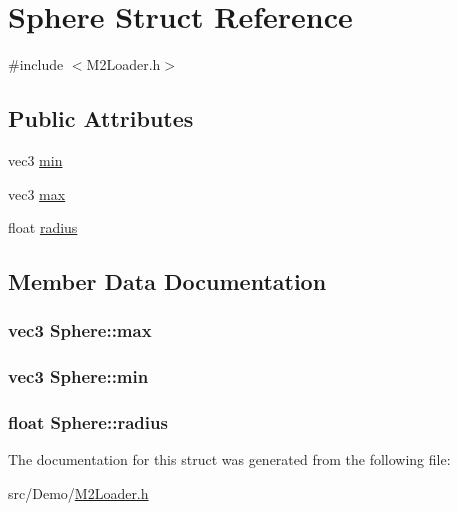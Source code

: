 \hypertarget{struct_sphere}{\section{Sphere Struct Reference}
\label{struct_sphere}
}


{\ttfamily \#include $<$M2\+Loader.\+h$>$}

\subsection*{Public Attributes}
\begin{DoxyCompactItemize}
\item 
vec3 \hyperlink{struct_sphere_adc106fc8b17889b893f11651fa5a29d9}{min}
\item 
vec3 \hyperlink{struct_sphere_aee6e629c46cebb1e1e91f6ef22c94ae2}{max}
\item 
float \hyperlink{struct_sphere_ae6f42f0da6679a2f0b4a22681ccccf38}{radius}
\end{DoxyCompactItemize}


\subsection{Member Data Documentation}
\hypertarget{struct_sphere_aee6e629c46cebb1e1e91f6ef22c94ae2}{
\subsubsection[{max}]{\setlength{\rightskip}{0pt plus 5cm}vec3 Sphere\+::max}}\label{struct_sphere_aee6e629c46cebb1e1e91f6ef22c94ae2}
\hypertarget{struct_sphere_adc106fc8b17889b893f11651fa5a29d9}{
\subsubsection[{min}]{\setlength{\rightskip}{0pt plus 5cm}vec3 Sphere\+::min}}\label{struct_sphere_adc106fc8b17889b893f11651fa5a29d9}
\hypertarget{struct_sphere_ae6f42f0da6679a2f0b4a22681ccccf38}{
\subsubsection[{radius}]{\setlength{\rightskip}{0pt plus 5cm}float Sphere\+::radius}}\label{struct_sphere_ae6f42f0da6679a2f0b4a22681ccccf38}


The documentation for this struct was generated from the following file\+:\begin{DoxyCompactItemize}
\item 
src/\+Demo/\hyperlink{_m2_loader_8h}{M2\+Loader.\+h}\end{DoxyCompactItemize}
